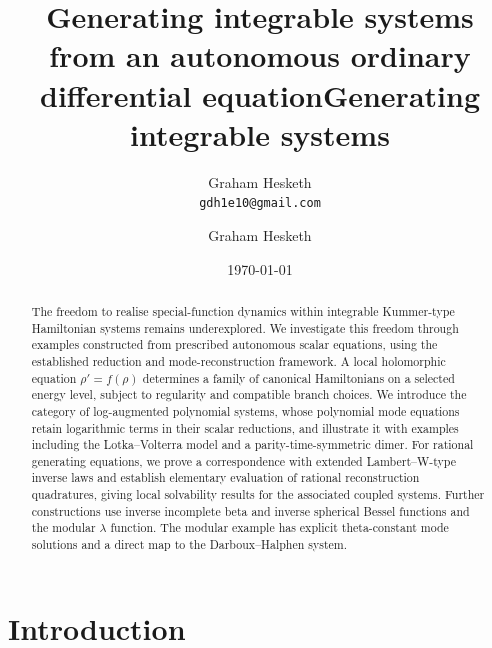 \documentclass[11pt,a4paper]{article}
\numberwithin{equation}{section}
\begin{document}
\ifpreprint
  \title{Generating integrable systems from an autonomous ordinary differential equation}
  \author{Graham Hesketh \\
  \small \texttt{gdh1e10@gmail.com}}
  \date{\today}
  \maketitle
\else
  \title{Generating integrable systems}
  
  \author{Graham Hesketh}


\fi


\begin{abstract}
The freedom to realise special-function dynamics within integrable Kummer-type Hamiltonian systems remains underexplored.
We investigate this freedom through examples constructed from prescribed autonomous scalar equations, using the established reduction and mode-reconstruction framework.
A local holomorphic equation $\rho'=f(\rho)$ determines a family of canonical Hamiltonians on a selected energy level, subject to regularity and compatible branch choices.
We introduce the category of log-augmented polynomial systems, whose polynomial mode equations retain logarithmic terms in their scalar reductions, and illustrate it with examples including the Lotka--Volterra model and a parity-time-symmetric dimer.
For rational generating equations, we prove a correspondence with extended Lambert--W-type inverse laws and establish elementary evaluation of rational reconstruction quadratures, giving local solvability results for the associated coupled systems.
Further constructions use inverse incomplete beta and inverse spherical Bessel functions and the modular $\lambda$ function.
The modular example has explicit theta-constant mode solutions and a direct map to the Darboux--Halphen system.
\end{abstract}



\section{Introduction}
\end{document}
